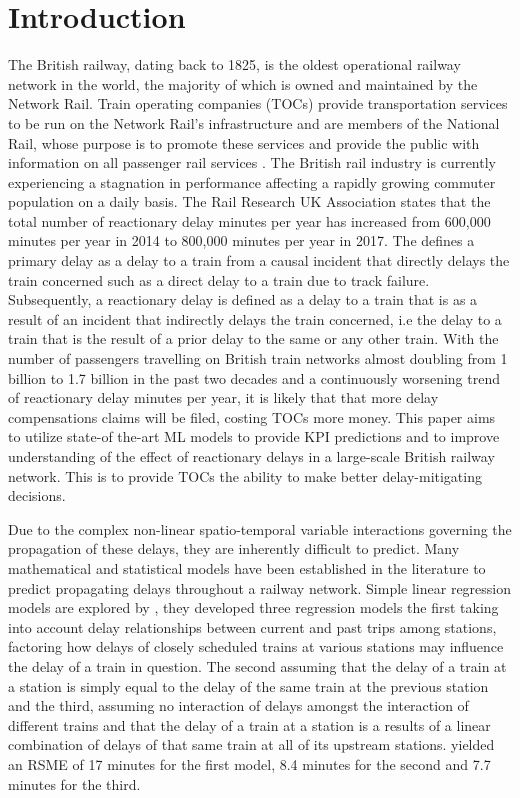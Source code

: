 \documentclass[]{interact}
\theoremstyle{plain}%
\theoremstyle{definition}
\theoremstyle{remark}
\begin{document}
\newpage
\section{Introduction} \label{IntroductionSection}

The British railway, dating back to 1825, is the oldest operational railway network in the world, the majority of which is owned and maintained by the Network Rail. Train operating companies (TOCs) provide transportation services to be run on the Network Rail’s infrastructure and are members of the National Rail, whose purpose is to promote these services and provide the public with information on all passenger rail services \citep{NATR19}. The British rail industry is currently experiencing a stagnation in performance affecting a rapidly growing commuter population on a daily basis. The Rail Research UK Association \citep{RRUKA19} states that the total number of reactionary delay minutes per year has increased from 600,000 minutes per year in 2014 to 800,000 minutes per year in 2017. The \cite{DAB20} defines a primary delay as a delay to a train from a causal incident that directly delays the train concerned such as a direct delay to a train due to track failure. Subsequently, a reactionary delay is defined as a delay to a train  that is as a result of an incident that indirectly delays the train concerned, i.e the delay to a train that is the result of a prior delay to the same or any other train. With the number of passengers travelling on British train networks almost doubling from 1 billion to 1.7 billion in the past two decades \citep{ORR19} and a continuously worsening trend of reactionary delay minutes per year, it is likely that that more delay compensations claims will be filed, costing TOCs more money. This paper aims to utilize state-of the-art ML models to provide KPI predictions and to improve understanding of the effect of reactionary delays in a large-scale British railway network. This is to provide TOCs the ability to make better delay-mitigating decisions.

Due to the complex non-linear spatio-temporal variable interactions governing the propagation of these delays, they are inherently difficult to predict. Many mathematical and statistical models have been established in the literature to predict propagating delays throughout a railway network. Simple linear regression models are explored by \cite{WAN15}, they developed three regression models the first taking into account delay relationships between current and past trips among stations, factoring how delays of closely scheduled trains at various stations may influence the delay of a train in question. The second assuming that the delay of a train at a station is simply equal to the delay of the same train at the previous station and the third, assuming no interaction of delays amongst the interaction of different trains and that the delay of a train at a station is a results of a linear combination of delays of that same train at all of its upstream stations. \cite{WAN15} yielded an RSME of 17 minutes for the first model, 8.4 minutes for the second and 7.7 minutes for the third. 
\end{document}
